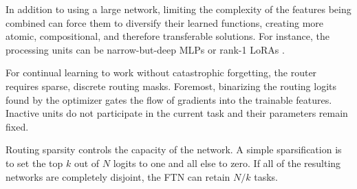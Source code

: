 \documentclass[11pt]{article}
\begin{document}
In addition to using a large network, limiting the complexity of the features being combined can force them to diversify their learned functions, creating more atomic, compositional, and therefore transferable solutions.
For instance, the processing units can be narrow-but-deep MLPs or rank-1 LoRAs .

For continual learning to work without catastrophic forgetting, the router requires sparse, discrete routing masks.
Foremost, binarizing the routing logits found by the optimizer gates the flow of gradients into the trainable features.
Inactive units do not participate in the current task and their parameters remain fixed.

Routing sparsity controls the capacity of the network.
A simple sparsification is to set the top $k$ out of $N$ logits to one and all else to zero.
If all of the resulting networks are completely disjoint, the FTN can retain $N/k$ tasks.

\end{document}
